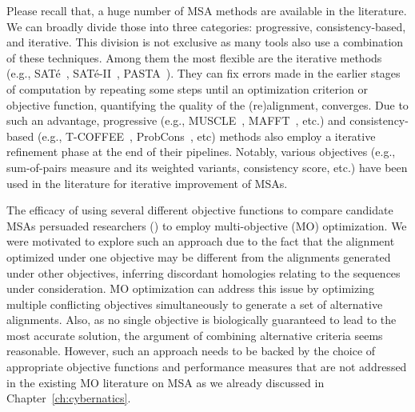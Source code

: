 Please recall that, a huge number of MSA methods are available in the literature. We can broadly divide those into three categories: progressive, consistency-based, and iterative. This division is not exclusive as many tools also use a combination of these techniques. Among them the most flexible are the iterative methods (e.g., SAT\'e~\cite{liu2009rapid}, SAT\'e-II~\cite{liu2012sate}, PASTA~\cite{mirarab2015pasta}). They can fix errors made in the earlier stages of computation by repeating some steps until an optimization criterion or objective function, quantifying the quality of the (re)alignment, converges. Due to such an advantage, progressive (e.g., MUSCLE~\cite{edgar2004muscle}, MAFFT~\cite{katoh2002mafft}, etc.) and consistency-based (e.g., T-COFFEE~\cite{notredame2000t}, ProbCons~\cite{do2005probcons}, etc) methods also employ a iterative refinement phase at the end of their pipelines. Notably, various objectives (e.g., sum-of-pairs measure and its weighted variants, consistency score, etc.) have been used in the literature for iterative improvement of MSAs.

 

The efficacy of using several different objective functions to compare candidate MSAs persuaded researchers (\cite{da2010alineaga, ortuno2013optimizing, soto2014multi, abbasi2015local, rubio2016hybrid, zambrano2017comparing, rubio2018characteristic, benitez2020sequoya}) to employ multi-objective (MO) optimization. We were motivated to explore such an approach due to the fact that the alignment optimized under one objective may be different from the alignments generated under other objectives, inferring discordant homologies relating to the sequences under consideration. MO optimization can address this issue by optimizing multiple conflicting objectives simultaneously to
generate a set of alternative alignments. Also, as no single objective is biologically guaranteed to lead to the most accurate solution, the argument of combining alternative criteria seems reasonable. However, such an approach needs to be backed by the choice of appropriate objective functions and performance measures that are not addressed in the existing MO literature on MSA as we already discussed in Chapter~\ref{ch:cybernatics}. 

